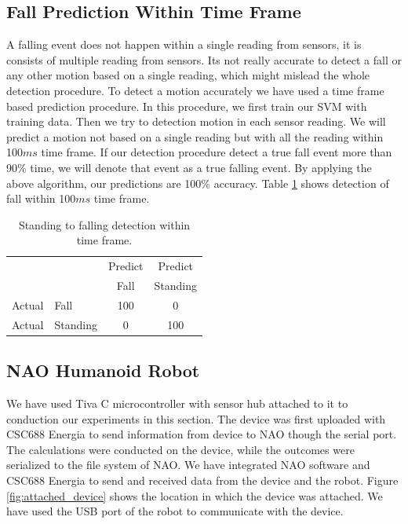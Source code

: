 \documentclass{llncs}
\begin{document}
\begin{sloppy}
\subsection*{Fall Prediction Within Time Frame}

A falling event does not happen within a single reading from sensors, it is consists of multiple
reading from sensors.  Its not really accurate to detect a fall or any other motion based on a
single reading, which might mislead the whole detection procedure. To detect a motion accurately we
have used a time frame based prediction procedure. In this procedure, we first train our SVM with
training data. Then we try to detection motion in each sensor reading. We will predict a motion not
based on a single reading but with all the reading within 100$ms$ time frame. If our detection
procedure detect a true fall event more than 90\% time, we will denote that event as a true
falling event. By applying the above algorithm, our predictions are 100\% accuracy.
Table \ref{tab:StandingToFallingDetectionsvmframe} shows detection of fall within 100$ms$ time
frame.

\begin{table}[!h]
\caption{Standing to falling detection within time frame.}
	\label{tab:StandingToFallingDetectionsvmframe}
	\centering
		\begin{tabular} {l l |c |c}
			& & Predict& Predict \\ 
			& & Fall & Standing \\ \hline
			Actual& Fall & 100 & 0\\ \hline
			Actual& Standing & 0& 100\\ \hline
		\end{tabular}
\end{table}

\subsection{NAO Humanoid Robot}

We have used Tiva C microcontroller with sensor hub attached to it to conduction our experiments in
this section. The device was first uploaded with CSC688 Energia to send information from device to
NAO though the serial port. The calculations were conducted on the device, while the outcomes were
serialized to the file system of NAO. We have integrated NAO software and CSC688 Energia to send and
received data from the device and the robot. Figure \ref{fig:attached_device} shows the location in
which the device was attached. We have used the USB port of the robot to communicate with the
device.  



\end{sloppy}
\end{document}
